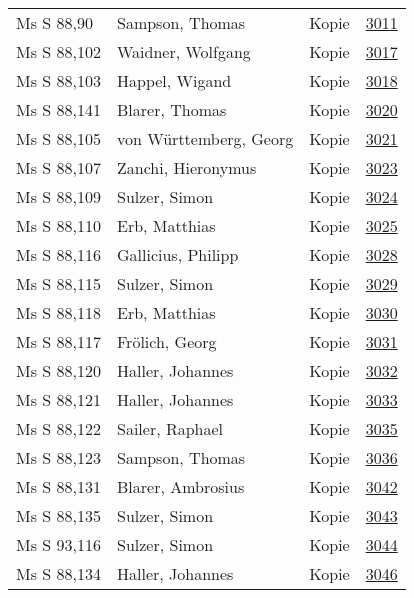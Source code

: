 \documentclass[10pt,a4paper,landscape]{report}
\begin{document}
\begin{longtable}{p{16cm}p{4cm}lr}
Ms S 88,90	&	Sampson, Thomas	&	Kopie	&	\href{http://130.60.24.72/assignment/3011}{3011}\\
Ms S 88,102	&	Waidner, Wolfgang	&	Kopie	&	\href{http://130.60.24.72/assignment/3017}{3017}\\
Ms S 88,103	&	Happel, Wigand	&	Kopie	&	\href{http://130.60.24.72/assignment/3018}{3018}\\
Ms S 88,141	&	Blarer, Thomas	&	Kopie	&	\href{http://130.60.24.72/assignment/3020}{3020}\\
Ms S 88,105	&	von Württemberg, Georg	&	Kopie	&	\href{http://130.60.24.72/assignment/3021}{3021}\\
Ms S 88,107	&	Zanchi, Hieronymus	&	Kopie	&	\href{http://130.60.24.72/assignment/3023}{3023}\\
Ms S 88,109	&	Sulzer, Simon	&	Kopie	&	\href{http://130.60.24.72/assignment/3024}{3024}\\
Ms S 88,110	&	Erb, Matthias	&	Kopie	&	\href{http://130.60.24.72/assignment/3025}{3025}\\
Ms S 88,116	&	Gallicius, Philipp	&	Kopie	&	\href{http://130.60.24.72/assignment/3028}{3028}\\
Ms S 88,115	&	Sulzer, Simon	&	Kopie	&	\href{http://130.60.24.72/assignment/3029}{3029}\\
Ms S 88,118	&	Erb, Matthias	&	Kopie	&	\href{http://130.60.24.72/assignment/3030}{3030}\\
Ms S 88,117	&	Frölich, Georg	&	Kopie	&	\href{http://130.60.24.72/assignment/3031}{3031}\\
Ms S 88,120	&	Haller, Johannes	&	Kopie	&	\href{http://130.60.24.72/assignment/3032}{3032}\\
Ms S 88,121	&	Haller, Johannes	&	Kopie	&	\href{http://130.60.24.72/assignment/3033}{3033}\\
Ms S 88,122	&	Sailer, Raphael	&	Kopie	&	\href{http://130.60.24.72/assignment/3035}{3035}\\
Ms S 88,123	&	Sampson, Thomas	&	Kopie	&	\href{http://130.60.24.72/assignment/3036}{3036}\\
Ms S 88,131	&	Blarer, Ambrosius	&	Kopie	&	\href{http://130.60.24.72/assignment/3042}{3042}\\
Ms S 88,135	&	Sulzer, Simon	&	Kopie	&	\href{http://130.60.24.72/assignment/3043}{3043}\\
Ms S 93,116	&	Sulzer, Simon	&	Kopie	&	\href{http://130.60.24.72/assignment/3044}{3044}\\
Ms S 88,134	&	Haller, Johannes	&	Kopie	&	\href{http://130.60.24.72/assignment/3046}{3046}\\

\end{longtable}
\end{document}

